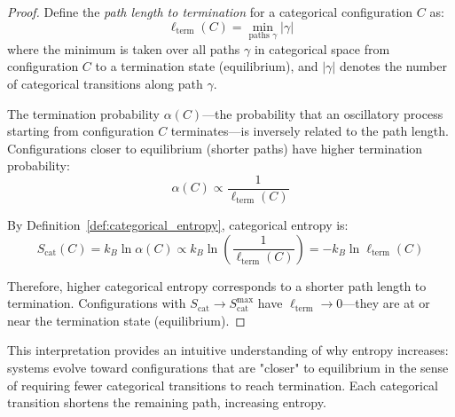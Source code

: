 \documentclass[12pt,a4paper]{article}
\theoremstyle{definition}
\theoremstyle{remark}
\begin{document}
\begin{proof}
Define the \emph{path length to termination} for a categorical configuration $C$ as:
\begin{equation}
\ell_{\text{term}}(C) = \min_{\text{paths } \gamma} |\gamma|
\end{equation}
where the minimum is taken over all paths $\gamma$ in categorical space from configuration $C$ to a termination state (equilibrium), and $|\gamma|$ denotes the number of categorical transitions along path $\gamma$.

The termination probability $\alpha(C)$—the probability that an oscillatory process starting from configuration $C$ terminates—is inversely related to the path length. Configurations closer to equilibrium (shorter paths) have higher termination probability:
\begin{equation}
\alpha(C) \propto \frac{1}{\ell_{\text{term}}(C)}
\end{equation}

By Definition~\ref{def:categorical_entropy}, categorical entropy is:
\begin{equation}
S_{\text{cat}}(C) = k_B \ln \alpha(C) \propto k_B \ln \left( \frac{1}{\ell_{\text{term}}(C)} \right) = -k_B \ln \ell_{\text{term}}(C)
\end{equation}

Therefore, higher categorical entropy corresponds to a shorter path length to termination. Configurations with $S_{\text{cat}} \to S_{\text{cat}}^{\max}$ have $\ell_{\text{term}} \to 0$—they are at or near the termination state (equilibrium).
\end{proof}

This interpretation provides an intuitive understanding of why entropy increases: systems evolve toward configurations that are "closer" to equilibrium in the sense of requiring fewer categorical transitions to reach termination. Each categorical transition shortens the remaining path, increasing entropy.
\end{document}

